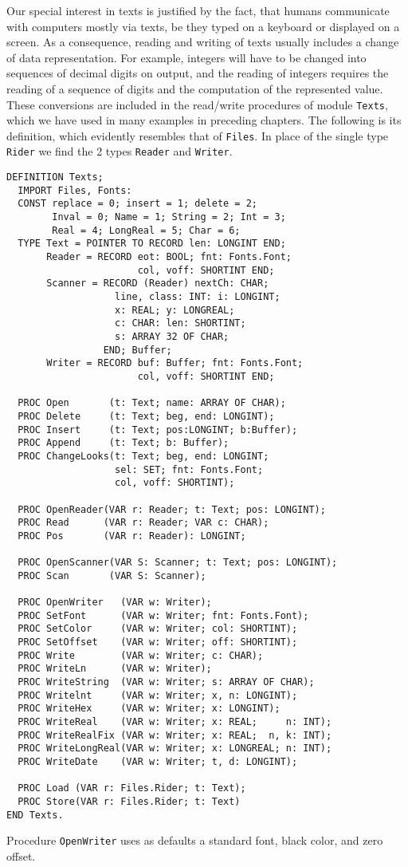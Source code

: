 Our special interest in texts is justified by the fact, that humans communicate with
computers mostly via texts, be they typed on a keyboard or displayed on a screen. As a
consequence, reading and writing of texts usually includes a change of data representation.
For example, integers will have to be changed into sequences of decimal digits on output,
and the reading of integers requires the reading of a sequence of digits and the computation
of the represented value. These conversions are included in the read/write procedures of
module \verb|Texts|, which we have used in many examples in preceding chapters. The
following is its definition, which evidently resembles that of \verb|Files|. In place of
the single type \verb|Rider| we find the 2 types \verb|Reader| and \verb|Writer|.
\begin{verbatim}
DEFINITION Texts;
  IMPORT Files, Fonts:
  CONST replace = 0; insert = 1; delete = 2;
        Inval = 0; Name = 1; String = 2; Int = 3;
        Real = 4; LongReal = 5; Char = 6;
  TYPE Text = POINTER TO RECORD len: LONGINT END;
       Reader = RECORD eot: BOOL; fnt: Fonts.Font;
                       col, voff: SHORTINT END;
       Scanner = RECORD (Reader) nextCh: CHAR;
                   line, class: INT: i: LONGINT;
                   x: REAL; y: LONGREAL;
                   c: CHAR: len: SHORTINT;
                   s: ARRAY 32 OF CHAR;
                 END; Buffer;
       Writer = RECORD buf: Buffer; fnt: Fonts.Font;
                       col, voff: SHORTINT END;

  PROC Open       (t: Text; name: ARRAY OF CHAR);
  PROC Delete     (t: Text; beg, end: LONGINT);
  PROC Insert     (t: Text; pos:LONGINT; b:Buffer);
  PROC Append     (t: Text; b: Buffer);
  PROC ChangeLooks(t: Text; beg, end: LONGINT;
                   sel: SET; fnt: Fonts.Font;
                   col, voff: SHORTINT);

  PROC OpenReader(VAR r: Reader; t: Text; pos: LONGINT);
  PROC Read      (VAR r: Reader; VAR c: CHAR);
  PROC Pos       (VAR r: Reader): LONGINT;

  PROC OpenScanner(VAR S: Scanner; t: Text; pos: LONGINT);
  PROC Scan       (VAR S: Scanner);

  PROC OpenWriter   (VAR w: Writer);
  PROC SetFont      (VAR w: Writer; fnt: Fonts.Font);
  PROC SetColor     (VAR w: Writer; col: SHORTINT);
  PROC SetOffset    (VAR w: Writer; off: SHORTINT);
  PROC Write        (VAR w: Writer; c: CHAR);
  PROC WriteLn      (VAR w: Writer);
  PROC WriteString  (VAR w: Writer; s: ARRAY OF CHAR);
  PROC Writelnt     (VAR w: Writer; x, n: LONGINT);
  PROC WriteHex     (VAR w: Writer; x: LONGINT);
  PROC WriteReal    (VAR w: Writer; x: REAL;     n: INT);
  PROC WriteRealFix (VAR w: Writer; x: REAL;  n, k: INT);
  PROC WriteLongReal(VAR w: Writer; x: LONGREAL; n: INT);
  PROC WriteDate    (VAR w: Writer; t, d: LONGINT);

  PROC Load (VAR r: Files.Rider; t: Text);
  PROC Store(VAR r: Files.Rider; t: Text)
END Texts.
\end{verbatim}
Procedure \verb|OpenWriter| uses as defaults a standard font, black color, and zero offset.

